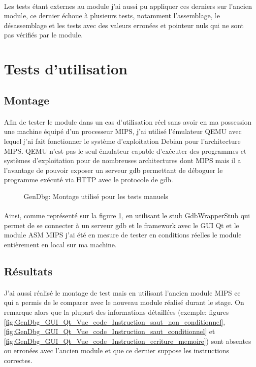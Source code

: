 \documentclass[11pt, book, english, french, standardlists]{upmethodology-document}
\begin{document}
				\paragraph*{}
					Les tests étant externes au module j'ai aussi pu appliquer ces derniers sur l'ancien module, ce dernier échoue à plusieurs tests, notamment l'assemblage, le désassemblage et les tests avec des valeurs erronées et pointeur nuls qui ne sont pas vérifiés par le module.
		\section{Tests d'utilisation}
			\subsection{Montage}
				\paragraph*{}
					Afin de tester le module dans un cas d'utilisation réel sans avoir en ma possession une machine équipé d'un processeur MIPS, j'ai utilisé l'émulateur QEMU avec lequel j'ai fait fonctionner le système d'exploitation Debian pour l'architecture MIPS. QEMU n'est pas le seul émulateur capable d'exécuter des programmes et systèmes d'exploitation pour de nombreuses architectures dont MIPS mais il a l'avantage de pouvoir exposer un serveur gdb permettant de déboguer le programme exécuté via \acrshort{HTTP} avec le protocole de gdb.
				\begin{figure}[H]
					\centering
					\caption{GenDbg: Montage utilisé pour les tests manuels}
					\label{fig:GenDbg_montage_test_manuels}
				\end{figure}
				\paragraph*{}
					Ainsi, comme représenté sur la figure \ref{fig:GenDbg_montage_test_manuels}, en utilisant le stub GdbWrapperStub qui permet de se connecter à un serveur gdb et le framework avec le \gls{GUI} Qt et le module ASM \gls{MIPS} j'ai été en mesure de tester en conditions réelles le module entièrement en local sur ma machine.
			\subsection{Résultats}
				\paragraph*{}
					J'ai aussi réalisé le montage de test mais en utilisant l'ancien module \gls{MIPS} ce qui a permis de le comparer avec le nouveau module réalisé durant le stage. On remarque alors  que la plupart des informations détaillées (exemple: figures \ref{fig:GenDbg_GUI_Qt_Vue_code_Instruction_saut_non_conditionnel}, \ref{fig:GenDbg_GUI_Qt_Vue_code_Instruction_saut_conditionnel} et \ref{fig:GenDbg_GUI_Qt_Vue_code_Instruction_ecriture_memoire}) sont absentes ou erronées avec l'ancien module et que ce dernier suppose les instructions correctes.
\end{document}
